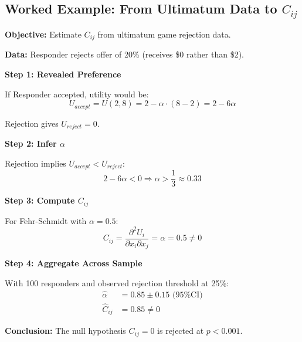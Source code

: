 
\subsection{Worked Example: From Ultimatum Data to $C_{ij}$}
\label{sec:EV-example}

\begin{tcolorbox}[colback=blue!5!white, colframe=blue!75!black,
    title=\textbf{Worked Example: Estimating Complementarity from Experimental Data}]

\textbf{Objective:} Estimate $C_{ij}$ from ultimatum game rejection data.

\textbf{Data:} Responder rejects offer of 20\% (receives \$0 rather than \$2).

\textbf{Step 1: Revealed Preference}

If Responder accepted, utility would be:
\[
U_{accept} = U(2, 8) = 2 - \alpha \cdot (8 - 2) = 2 - 6\alpha
\]

Rejection gives $U_{reject} = 0$.

\textbf{Step 2: Infer $\alpha$}

Rejection implies $U_{accept} < U_{reject}$:
\[
2 - 6\alpha < 0 \Rightarrow \alpha > \frac{1}{3} \approx 0.33
\]

\textbf{Step 3: Compute $C_{ij}$}

For Fehr-Schmidt with $\alpha = 0.5$:
\[
C_{ij} = \frac{\partial^2 U_i}{\partial x_i \partial x_j} = \alpha = 0.5 \neq 0
\]

\textbf{Step 4: Aggregate Across Sample}

With 100 responders and observed rejection threshold at 25\%:
\begin{align*}
\hat{\alpha} &= 0.85 \pm 0.15 \text{ (95\% CI)} \\
\hat{C}_{ij} &= 0.85 \neq 0
\end{align*}

\textbf{Conclusion:} The null hypothesis $C_{ij} = 0$ is rejected at $p < 0.001$.

\end{tcolorbox}


